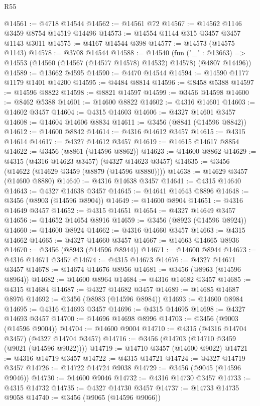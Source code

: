 \begin{lexlean}{R55}
\begin{coremodule}
@14561 := @4718 @14544
@14562 := @14561 @72
@14567 := @14562 @1146 @3459 @8754 @14519 @14496
@14573 := @14554 @1144 @315 @3457 @3457 @1143 @3011
@14575 := @4167 @14544 @398
@14577 := @14573 (@14575 @1143)
@14578 := @3708 @14544
@14588 := @14540
    (fun ("_" : @13663) => @14553 (@14560 (@14567 (@14577 @14578) @14532) @14578) (@4807 @14496))
@14589 := @13662 @4595
@14590 := @4470 @14544
@14594 := @14590 @1177 @1179 @1401 @14200
@14595 := @4484 @8814
@14596 := @8458 @5388
@14597 := @14596 @8822
@14598 := @8821 @14597
@14599 := @3456 @14598
@14600 := @8462 @5388
@14601 := @14600 @8822
@14602 := @4316 @14601
@14603 := @14602 @3457
@14604 := @4315 @14603
@14606 := @4327 @14601 @3457
@14608 := @14604 @14606 @8834
@14611 := @3456 (@8841 (@14596 @8842))
@14612 := @14600 @8842
@14614 := @4316 @14612 @3457
@14615 := @4315 @14614
@14617 := @4327 @14612 @3457
@14619 := @14615 @14617 @8854
@14622 := @3456 (@8861 (@14596 @8862))
@14623 := @14600 @8862
@14629 := @4315 (@4316 @14623 @3457) (@4327 @14623 @3457)
@14635 := @3456 (@14622 (@14629 @3459 (@8879 (@14596 @8880))))
@14638 := @14629 @3457 (@14600 @8880)
@14640 := @4316 @14638 @3457
@14641 := @4315 @14640
@14643 := @4327 @14638 @3457
@14645 := @14641 @14643 @8896
@14648 := @3456 (@8903 (@14596 @8904))
@14649 := @14600 @8904
@14651 := @4316 @14649 @3457
@14652 := @4315 @14651
@14654 := @4327 @14649 @3457
@14656 := @14652 @14654 @8916
@14659 := @3456 (@8923 (@14596 @8924))
@14660 := @14600 @8924
@14662 := @4316 @14660 @3457
@14663 := @4315 @14662
@14665 := @4327 @14660 @3457
@14667 := @14663 @14665 @8936
@14670 := @3456 (@8943 (@14596 @8944))
@14671 := @14600 @8944
@14673 := @4316 @14671 @3457
@14674 := @4315 @14673
@14676 := @4327 @14671 @3457
@14678 := @14674 @14676 @8956
@14681 := @3456 (@8963 (@14596 @8964))
@14682 := @14600 @8964
@14684 := @4316 @14682 @3457
@14685 := @4315 @14684
@14687 := @4327 @14682 @3457
@14689 := @14685 @14687 @8976
@14692 := @3456 (@8983 (@14596 @8984))
@14693 := @14600 @8984
@14695 := @4316 @14693 @3457
@14696 := @4315 @14695
@14698 := @4327 @14693 @3457
@14700 := @14696 @14698 @8996
@14703 := @3456 (@9003 (@14596 @9004))
@14704 := @14600 @9004
@14710 := @4315 (@4316 @14704 @3457) (@4327 @14704 @3457)
@14716 := @3456 (@14703 (@14710 @3459 (@9021 (@14596 @9022))))
@14719 := @14710 @3457 (@14600 @9022)
@14721 := @4316 @14719 @3457
@14722 := @4315 @14721
@14724 := @4327 @14719 @3457
@14726 := @14722 @14724 @9038
@14729 := @3456 (@9045 (@14596 @9046))
@14730 := @14600 @9046
@14732 := @4316 @14730 @3457
@14733 := @4315 @14732
@14735 := @4327 @14730 @3457
@14737 := @14733 @14735 @9058
@14740 := @3456 (@9065 (@14596 @9066))

\end{coremodule}
\end{lexlean}
